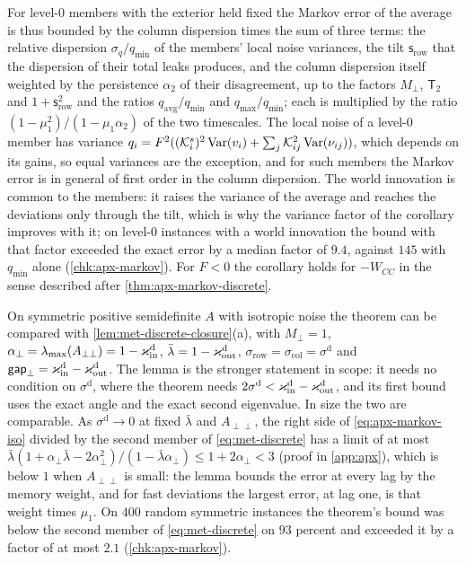 For level-0 members with the exterior held fixed the Markov error of the average is thus bounded by the column dispersion times the sum of three terms: the relative dispersion $\sigma_q/q_{\min}$ of the members' local noise variances, the tilt $\mathsf s_{\mathrm{row}}$ that the dispersion of their total leaks produces, and the column dispersion itself weighted by the persistence $\alpha_2$ of their disagreement, up to the factors $M_\perp$, $\mathsf T_2$ and $1+\mathsf s_{\mathrm{row}}^2$ and the ratios $q_{\mathrm{avg}}/q_{\min}$ and $q_{\max}/q_{\min}$; each is multiplied by the ratio $(1-\mu_1^2)/(1-\mu_1\alpha_2)$ of the two timescales. The local noise of a level-0 member has variance $q_i=F^2((\mathcal{K}^s_i)^2\operatorname{Var}(v_i)+\sum_j\mathcal{K}_{ij}^2\operatorname{Var}(\nu_{ij}))$, which depends on its gains, so equal variances are the exception, and for such members the Markov error is in general of first order in the column dispersion. The world innovation is common to the members: it raises the variance of the average and reaches the deviations only through the tilt, which is why the variance factor of the corollary improves with it; on level-0 instances with a world innovation the bound with that factor exceeded the exact error by a median factor of $9.4$, against $145$ with $q_{\min}$ alone (\cref{chk:apx-markov}). For $F<0$ the corollary holds for $-W_{CC}$ in the sense described after \cref{thm:apx-markov-discrete}.

On symmetric positive semidefinite $A$ with isotropic noise the theorem can be compared with \cref{lem:met-discrete-closure}(a), with $M_\perp=1$, $\alpha_\perp=\lambda_{\max}(A_{\perp\perp})=1-\varkappa_{\mathrm{in}}^{\mathrm d}$, $\bar\lambda=1-\varkappa_{\mathrm{out}}^{\mathrm d}$, $\sigma_{\mathrm{row}}=\sigma_{\mathrm{col}}=\sigma^{\mathrm d}$ and $\mathsf{gap}_\perp=\varkappa_{\mathrm{in}}^{\mathrm d}-\varkappa_{\mathrm{out}}^{\mathrm d}$. The lemma is the stronger statement in scope: it needs no condition on $\sigma^{\mathrm d}$, where the theorem needs $2\sigma^{\mathrm d}<\varkappa_{\mathrm{in}}^{\mathrm d}-\varkappa_{\mathrm{out}}^{\mathrm d}$, and its first bound uses the exact angle and the exact second eigenvalue. In size the two are comparable. As $\sigma^{\mathrm d}\to0$ at fixed $\bar\lambda$ and $A_{\perp\perp}$, the right side of \eqref{eq:apx-markov-iso} divided by the second member of \eqref{eq:met-discrete} has a limit of at most $\bar\lambda(1+\alpha_\perp\bar\lambda-2\alpha_\perp^2)/(1-\bar\lambda\alpha_\perp)\le1+2\alpha_\perp<3$ (proof in \cref{app:apx}), which is below $1$ when $A_{\perp\perp}$ is small: the lemma bounds the error at every lag by the memory weight, and for fast deviations the largest error, at lag one, is that weight times $\mu_1$. On $400$ random symmetric instances the theorem's bound was below the second member of \eqref{eq:met-discrete} on $93$ percent and exceeded it by a factor of at most $2.1$ (\cref{chk:apx-markov}).

